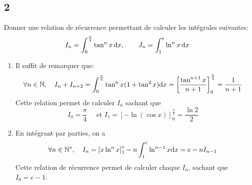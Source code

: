 \documentclass{article}[11pt]
\def \de {{\rm d}}
\begin{document}
\subsection*{2}
{\color{blue}
Donner une relation de récurrence permettant de calculer les intégrales suivantes:
\[I_n=\int_0^{\frac{\pi}{4}}\tan^nx\,\de x,\qquad J_n=\int_1^e\ln^nx\,\de x\]
}
\begin{enumerate}
\item Il suffit de remarquer que:
\[\forall n\in\mathbb{N},\quad I_n+I_{n+2}=\int_0^{\frac{\pi}{4}}\tan^nx(1+\tan^2x)\de x=\left[\frac{\tan^{n+1}x}{n+1}\right]_0^{\frac{\pi}{4}}=\frac{1}{n+1}\]
Cette relation permet de calculer $I_n$ sachant que
\[I_0=\frac{\pi}{4}\quad\mbox{ et }I_1=\left[-\ln(\cos x)\right]_0^{\frac{\pi}{4}}=\frac{\ln 2}{2}\]
\item En intégrant par parties, on a
\[\forall n\in\mathbb{N^*},\quad I_n=\left[x\ln^nx\right]_1^e-n\int_1^e\ln^{n-1}x\de x=e-nI_{n-1}\]
Cette relation de récurrence permet de calculer chaque $I_n$, sachant que $I_0=e-1$.
\end{enumerate}
\end{document}
